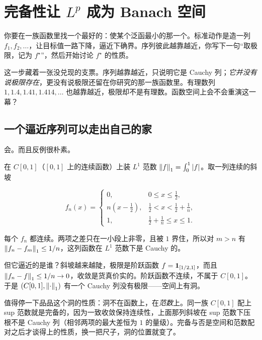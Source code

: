 \section{\texorpdfstring{完备性让 \(L^p\) 成为 Banach 空间}{完备性让 Lp 成为 Banach 空间}}
\label{sec:12-Real-Analysis-Support/07-Lp-Spaces-and-Function-Geometry/02}

你要在一族函数里找一个最好的：使某个泛函最小的那一个。标准动作是造一列 \(f_1,f_2,\dots\)，让目标值一路下降，逼近下确界。序列彼此越靠越近，你写下一句``取极限，记为 \(f^\star\)''，然后开始讨论 \(f^\star\) 的性质。

这一步藏着一张没兑现的支票。序列越靠越近，只说明它是 Cauchy 列；\emph{它并没有说极限存在}，更没有说极限还留在你研究的那一族函数里。有理数列 \(1,1.4,1.41,1.414,\dots\) 也越靠越近，极限却不是有理数。函数空间上会不会重演这一幕？

\subsection{一个逼近序列可以走出自己的家}

会。而且反例很朴素。

在 \(C[0,1]\)（\([0,1]\) 上的连续函数）上装 \(L^1\) 范数 \(\left\lVert f\right\rVert_1=\int_0^1|f|\)。取一列连续的斜坡

\[
f_n(x)=
\begin{cases}
0, & 0\le x\le \tfrac12,\\[2pt]
n\left(x-\tfrac12\right), & \tfrac12<x<\tfrac12+\tfrac1n,\\[2pt]
1, & \tfrac12+\tfrac1n\le x\le 1 .
\end{cases}
\]

每个 \(f_n\) 都连续。两项之差只在一小段上非零，且被 \(1\) 界住，所以对 \(m>n\) 有 \(\left\lVert f_n-f_m\right\rVert_1\le 1/n\)，这列函数在 \(L^1\) 范数下是 Cauchy 的。

但它逼近的是谁？斜坡越来越陡，极限是阶跃函数 \(f=\mathbf{1}_{[1/2,1]}\)，而且 \(\left\lVert f_n-f\right\rVert_1\le 1/n\to0\)，收敛是货真价实的。阶跃函数不连续，不属于 \(C[0,1]\)。于是 \((C[0,1],\left\lVert\cdot\right\rVert_1)\) 有一个 Cauchy 列没有极限——空间上有洞。

值得停一下品品这个洞的性质：洞不在函数上，在\emph{范数}上。同一族 \(C[0,1]\) 配上 sup 范数就是完备的，因为一致收敛保持连续性，上面那列斜坡在 sup 范数下压根不是 Cauchy 列（相邻两项的最大差恒为 \(1\) 的量级）。完备与否是空间和范数配对之后才谈得上的性质，换一把尺子，洞的位置就变了。

